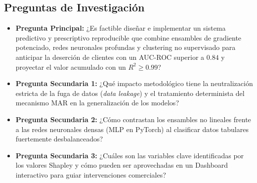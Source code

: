 \documentclass[11pt,letterpaper]{article}
\begin{document}
\subsection{Preguntas de Investigación}
\begin{itemize}
    \item \textbf{Pregunta Principal:} ¿Es factible diseñar e implementar un sistema predictivo y prescriptivo reproducible que combine ensambles de gradiente potenciado, redes neuronales profundas y clustering no supervisado para anticipar la deserción de clientes con un AUC-ROC superior a $0.84$ y proyectar el valor acumulado con un $R^2 \ge 0.99$?
    \item \textbf{Pregunta Secundaria 1:} ¿Qué impacto metodológico tiene la neutralización estricta de la fuga de datos (\textit{data leakage}) y el tratamiento determinista del mecanismo MAR en la generalización de los modelos?
    \item \textbf{Pregunta Secundaria 2:} ¿Cómo contrastan los ensambles no lineales frente a las redes neuronales densas (MLP en PyTorch) al clasificar datos tabulares fuertemente desbalanceados?
    \item \textbf{Pregunta Secundaria 3:} ¿Cuáles son las variables clave identificadas por los valores Shapley y cómo pueden ser aprovechadas en un Dashboard interactivo para guiar intervenciones comerciales?
\end{itemize}
\end{document}
